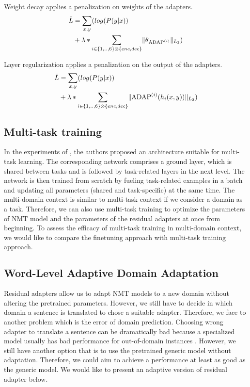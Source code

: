\documentclass[11pt,a4paper]{article}
\newcommand{\fyTodo}[1]{\Todo[FY:]{\textcolor{orange}{#1}}}
\newcommand{\mpTodo}[1]{\Todo[MP:]{\textcolor{green}{#1}}}
\begin{document}
Weight decay applies a penalization on weights of the adapters.
\begin{equation}
  \begin{split}
    \bar{L} & = \mathop{\sum}_{x,y} (log(P(y|x)) \\
    & + \lambda * \sum_{i \in \{1,..,6\} \otimes \{enc, dec\}} \normL{\theta_{\operatorname{ADAP}^{(i)}}})
  \end{split}
\end{equation}

Layer regularization applies a penalization on the output of the adapters.
\begin{equation}
  \begin{split}
    \bar{L} & = \mathop{\sum}_{x,y} (log(P(y|x)) \\
    & + \lambda * \sum_{i \in \{1,..,6\} \otimes \{enc, dec\}} \normL{\operatorname{ADAP}^{(i)}(h_i(x,y))})
  \end{split}
\end{equation}

\subsection{Multi-task training\label{ssec:multitask}}
In the experiments of \cite{Caruana97multitask}, the authors proposed an architecture suitable for multi-task learning. The corresponding network comprises a ground layer, which is shared between tasks and is followed by task-related layers in the next level. The network is then trained from scratch by fueling task-related examples in a batch and updating all parameters (shared and task-specific) at the same time. The multi-domain context is similar to multi-task context if we consider a domain as a task\cite{Dredze08}. Therefore, we can also use multi-task training to optimize the parameters of NMT model and the parameters of the residual adapters at once from beginning. To assess the efficacy of multi-task training in multi-domain context, we would like to compare the finetuning approach with multi-task training approach. \fyTodo{Change the training regime}

\subsection{Word-Level Adaptive Domain Adaptation \label{ssec:wada}}
\mpTodo{Formalizing problem, network design, training algorithm}
Residual adapters allow us to adapt NMT models to a new domain without altering the pretrained parameters. However, we still have to decide in which domain a sentence is translated to chose a suitable adapter.\fyTodo{Lack of context - domain errors} Therefore, we face to another problem which is the error of domain prediction. Choosing wrong adapter to translate a sentence can be dramatically bad because a specialized model usually has bad performance for out-of-domain instances \cite{McCloskey89catastrophic}. However, we still have another option that is to use the pretrained generic model without adaptation. Therefore, we could aim to achieve a performance at least as good as the generic model. We would like to present an adaptive version of residual adapter below.
\end{document}
